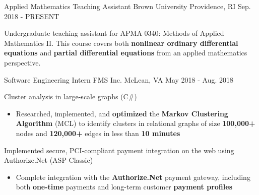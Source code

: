 \begin{cventries}
    \cventry
	{Applied Mathematics Teaching Assistant}
	{Brown University}
	{Providence, RI}
	{Sep. 2018 - PRESENT}
    {
        \begin{cvitems}
		\item{Undergraduate teaching assistant for APMA 0340: Methods of Applied Mathematics II. This course covers both \textbf{nonlinear ordinary differential equations} and \textbf{partial differential equations} from an applied mathematics perspective.}
        \end{cvitems}
    }
    \cventry
    {Software Engineering Intern}
	{FMS Inc.}
    {McLean, VA}
    {May 2018 - Aug. 2018}
    {
        \begin{cvitems}
		\item{Cluster analysis in large-scale graphs (C\#)}
			\begin{itemize}
				\item{Researched, implemented, and \textbf{optimized} the \textbf{Markov Clustering Algorithm} (MCL) to identify clusters in relational graphs of size \textbf{100,000+} nodes and \textbf{120,000+} edges in less than \textbf{10 minutes}}
			\end{itemize}
		\item{Implemented secure, PCI-compliant payment integration on the web using Authorize.Net (ASP Classic)}
			\begin{itemize}
				\item{Complete integration with the \textbf{Authorize.Net} payment gateway, including both \textbf{one-time} payments and long-term customer \textbf{payment profiles}}
			\end{itemize}
        \end{cvitems}
    }

\end{cventries}
